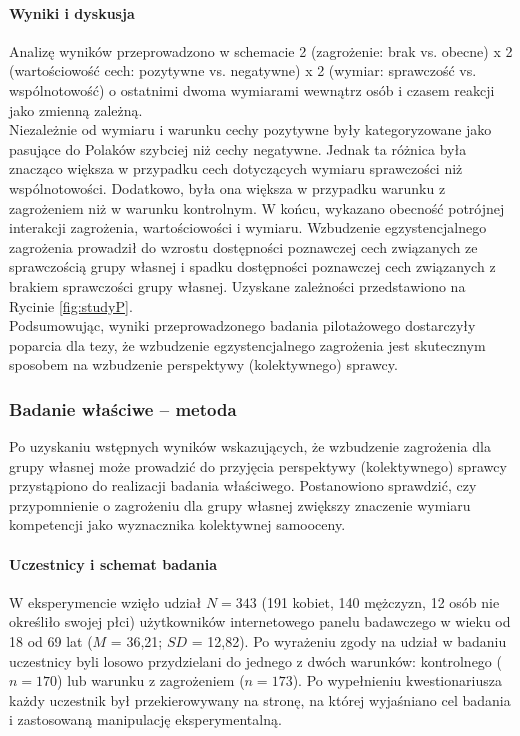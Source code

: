\documentclass[man]{apa6}
\begin{document}
\paragraph{Wyniki i dyskusja}
Analizę wyników przeprowadzono w schemacie 2 (zagrożenie: brak vs. obecne) x 2 (wartościowość cech: pozytywne vs. negatywne) x 2 (wymiar: sprawczość vs. wspólnotowość) o ostatnimi dwoma wymiarami wewnątrz osób i czasem reakcji jako zmienną zależną.\\

Niezależnie od wymiaru i warunku cechy pozytywne były kategoryzowane jako pasujące do Polaków szybciej niż cechy negatywne. Jednak ta różnica była znacząco większa w przypadku cech dotyczących wymiaru sprawczości niż wspólnotowości. Dodatkowo, była ona większa w przypadku warunku z zagrożeniem niż w warunku kontrolnym. W końcu, wykazano obecność potrójnej interakcji zagrożenia, wartościowości i wymiaru. Wzbudzenie egzystencjalnego zagrożenia prowadził do wzrostu dostępności poznawczej cech związanych ze sprawczością grupy własnej i spadku dostępności poznawczej cech związanych z brakiem sprawczości grupy własnej. Uzyskane zależności przedstawiono na Rycinie \ref{fig:studyP}.\\

Podsumowując, wyniki przeprowadzonego badania pilotażowego dostarczyły poparcia dla tezy, że wzbudzenie egzystencjalnego zagrożenia jest skutecznym sposobem na wzbudzenie perspektywy (kolektywnego) sprawcy.

\begin{figure*}[htbp]
   \centering
   \caption{Szybkość kategoryzacji, jako charakterystyczne dla Polaków, pozytywnych i negatywnch cech sprawczych i wspólnotowych a obecność zagrożenia.}
   \label{fig:studyP}
\end{figure*}

\subsubsection{Badanie właściwe -- metoda}

Po uzyskaniu wstępnych wyników wskazujących, że wzbudzenie zagrożenia dla grupy własnej może prowadzić do przyjęcia  perspektywy (kolektywnego) sprawcy przystąpiono do realizacji badania właściwego. Postanowiono sprawdzić, czy przypomnienie o zagrożeniu dla grupy własnej zwiększy znaczenie wymiaru kompetencji jako wyznacznika kolektywnej samooceny.

\paragraph{Uczestnicy i schemat badania}
W eksperymencie wzięło udział $N=343$ (191 kobiet, 140 mężczyzn, 12 osób nie określiło swojej płci) użytkowników internetowego panelu badawczego w wieku od 18 od 69 lat ($M$ = 36,21; $SD$ = 12,82). Po wyrażeniu zgody na udział w badaniu uczestnicy byli losowo przydzielani do jednego z dwóch warunków: kontrolnego ($n = 170$) lub warunku z zagrożeniem ($n = 173$). Po wypełnieniu kwestionariusza każdy uczestnik był przekierowywany na stronę, na której wyjaśniano cel badania i zastosowaną manipulację eksperymentalną.
\end{document}
